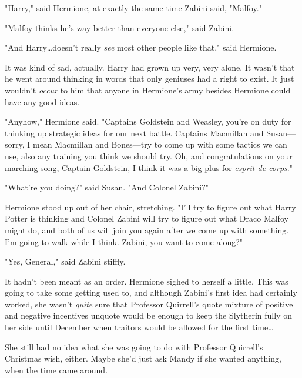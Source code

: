 "Harry," said Hermione, at exactly the same time Zabini said, "Malfoy."

"Malfoy thinks he's way better than everyone else," said Zabini.

"And Harry…doesn't really \emph{see} most other people like that," said
Hermione.

It was kind of sad, actually. Harry had grown up very, very alone. It wasn't
that he went around thinking in words that only geniuses had a right to exist.
It just wouldn't \emph{occur} to him that anyone in Hermione's army besides
Hermione could have any good ideas.

"Anyhow," Hermione said. "Captains Goldstein and Weasley, you're on duty for
thinking up strategic ideas for our next battle. Captains Macmillan and
Susan—sorry, I mean Macmillan and Bones—try to come up with some tactics we
can use, also any training you think we should try. Oh, and congratulations on
your marching song, Captain Goldstein, I think it was a big plus for
\emph{esprit de corps}."

"What're you doing?" said Susan. "And Colonel Zabini?"

Hermione stood up out of her chair, stretching. "I'll try to figure out what
Harry Potter is thinking and Colonel Zabini will try to figure out what Draco
Malfoy might do, and both of us will join you again after we come up with
something. I'm going to walk while I think. Zabini, you want to come along?"

"Yes, General," said Zabini stiffly.

It hadn't been meant as an order. Hermione sighed to herself a little. This was
going to take some getting used to, and although Zabini's first idea had
certainly worked, she wasn't \emph{quite} sure that Professor Quirrell's quote
mixture of positive and negative incentives unquote would be enough to keep the
Slytherin fully on her side until December when traitors would be allowed for
the first time…

She still had no idea what she was going to do with Professor Quirrell's
Christmas wish, either. Maybe she'd just ask Mandy if she wanted anything, when
the time came around.
